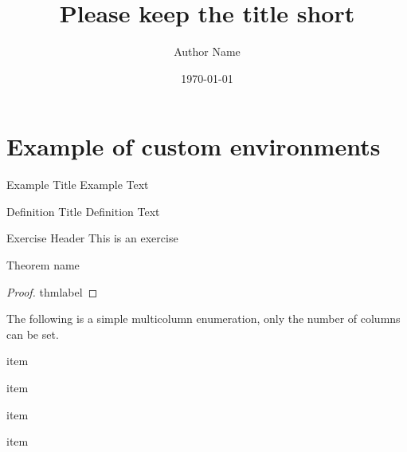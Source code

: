 \documentclass{uhcourse}
\title{Please keep the title short}
\author{Author Name}
\date{\today}
\begin{document}
\maketitle
\thispagestyle{empty}

\clearpage
\hypertarget{contents}{}
\thispagestyle{fancy}
\tableofcontents

\clearpage
\section{Example of custom environments}
\lipsum[1]
\begin{example}{Example Title}
    Example Text
    \lipsum[66]
\end{example}


\begin{definition}{Definition Title}
    Definition Text
    \lipsum[66]
\end{definition}

\begin{exercise}{Exercise Header}
    This is an exercise
    \lipsum[66]
\end{exercise}

\begin{theorem}[thmlabel]{Theorem name}
    \lipsum[66]
\end{theorem}

\begin{proof}{thmlabel}
    \lipsum[66]
\end{proof}

The following is a simple multicolumn enumeration, only the number of columns can be set.
\begin{enumulti}{2}
    \item{item}
    \item{item}
    \item{item}
    \item{item}
\end{enumulti}


\listofexercises
\end{document}
